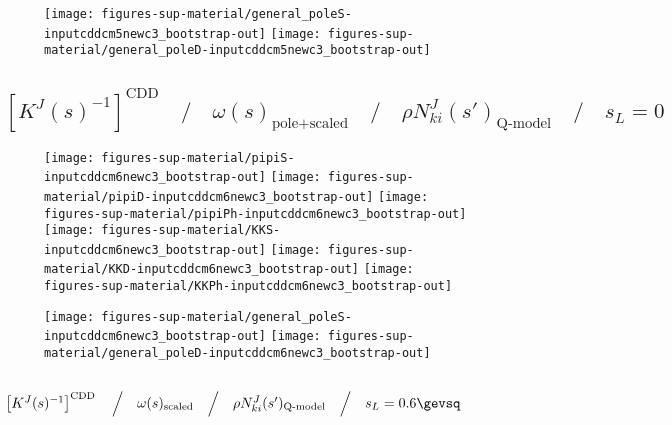 \begin{figure}[h]
\centering\texttt{[image: figures-sup-material/general\_poleS-inputcddcm5newc3\_bootstrap-out]} \texttt{[image: figures-sup-material/general\_poleD-inputcddcm5newc3\_bootstrap-out]}
\end{figure}



\clearpage

\subsection{$\left[K^J(s)^{-1}\right]^\text{CDD} \quad\Big/\quad \omega(s)_\text{pole+scaled} \quad\Big/\quad \rho N^J_{ki}(s')_\text{Q-model} \quad\Big/\quad s_L = 0$}
\label{subsec:inputcddcm6newc3_bootstrap-out}






\begin{figure}[h]
\centering\texttt{[image: figures-sup-material/pipiS-inputcddcm6newc3\_bootstrap-out]} \texttt{[image: figures-sup-material/pipiD-inputcddcm6newc3\_bootstrap-out]} \texttt{[image: figures-sup-material/pipiPh-inputcddcm6newc3\_bootstrap-out]}
\texttt{[image: figures-sup-material/KKS-inputcddcm6newc3\_bootstrap-out]} \texttt{[image: figures-sup-material/KKD-inputcddcm6newc3\_bootstrap-out]} \texttt{[image: figures-sup-material/KKPh-inputcddcm6newc3\_bootstrap-out]}
\end{figure}

\begin{figure}[h]
\centering\texttt{[image: figures-sup-material/general\_poleS-inputcddcm6newc3\_bootstrap-out]} \texttt{[image: figures-sup-material/general\_poleD-inputcddcm6newc3\_bootstrap-out]}
\end{figure}



\clearpage

\subsection{$\left[K^J(s)^{-1}\right]^\text{CDD} \quad\Big/\quad \omega(s)_\text{scaled} \quad\Big/\quad \rho N^J_{ki}(s')_\text{Q-model} \quad\Big/\quad s_L = 0.6\gevsq$}
\label{subsec:inputcddcm7newc3_bootstrap-out}


